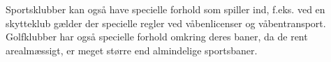 Sportsklubber kan også have specielle forhold som spiller ind, f.eks. ved en skytteklub gælder der specielle regler ved våbenlicenser og våbentransport. Golfklubber har også specielle forhold omkring deres baner, da de rent arealmæssigt, er meget større end almindelige sportsbaner. 











